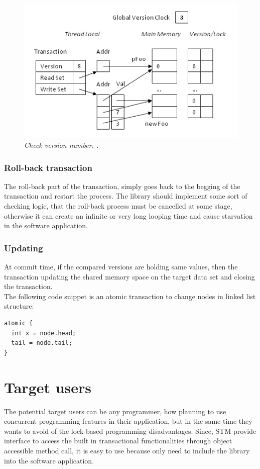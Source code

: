 \documentclass[12pt]{article}
\begin{document}
\begin{figure}[h!]
\centering
\includegraphics[scale=0.4]{Pictures/version.png}
\caption{\textit{\color{gray}Check version number. \cite{Bartosz}.}}
\end{figure}


\subsubsection{Roll-back transaction}
The roll-back part of the transaction, simply goes back to the begging of the transaction and restart the process. The library should implement some sort of checking logic, that the roll-back process must be cancelled at some stage, otherwise it can create an infinite or very long looping time and cause starvation in the software application.

\subsubsection{Updating}
At commit time, if the compared versions are holding same values, then the transaction updating the shared memory space on the target data set and closing the transaction. \\

The following code snippet is an atomic transaction to change nodes in linked list structure:
\begin{lstlisting}
atomic {
  int x = node.head;
  tail = node.tail;
}
\end{lstlisting}

\section{Target users}
The potential target users can be any programmer, how planning to use concurrent programming features in their application, but in the same time they wants to avoid of the lock based programming disadvantages. Since, STM provide interface to access the built in transactional functionalities through object accessible method call, it is easy to use because only need to include the library into the software application.\\
\end{document}
